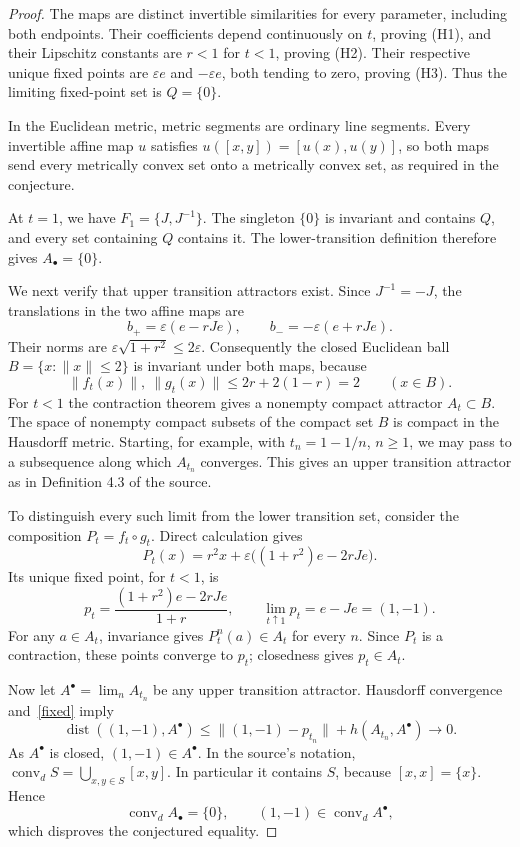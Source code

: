 \documentclass[11pt]{article}
\newcommand{\Al}{A_{\bullet}}
\newcommand{\Au}{A^{\bullet}}
\begin{document}
\begin{proof}
The maps are distinct invertible similarities for every parameter,
including both endpoints. Their coefficients depend continuously on
$t$, proving (H1), and their Lipschitz constants are $r<1$ for $t<1$,
proving (H2). Their respective unique fixed points are
$\varepsilon e$ and $-\varepsilon e$, both tending to zero, proving
(H3). Thus the limiting fixed-point set is $Q=\{0\}$.

In the Euclidean metric, metric segments are ordinary line segments.
Every invertible affine map $u$ satisfies
$u([x,y])=[u(x),u(y)]$, so both maps send every metrically convex set
onto a metrically convex set, as required in the conjecture.

At $t=1$, we have $F_1=\{J,J^{-1}\}$. The singleton $\{0\}$ is
invariant and contains $Q$, and every set containing $Q$ contains it.
The lower-transition definition therefore gives $\Al=\{0\}$.

We next verify that upper transition attractors exist. Since
$J^{-1}=-J$, the translations in the two affine maps are
\[
 b_+=\varepsilon(e-rJe),\qquad
 b_-=-\varepsilon(e+rJe).
\]
Their norms are $\varepsilon\sqrt{1+r^2}\leq2\varepsilon$.
Consequently the closed Euclidean ball $B=\{x:\|x\|\leq2\}$ is
invariant under both maps, because
\[
 \|f_t(x)\|,\ \|g_t(x)\|
 \leq2r+2(1-r)=2\qquad(x\in B).
\]
For $t<1$ the contraction theorem gives a nonempty compact attractor
$A_t\subset B$. The space of nonempty compact subsets of the compact
set $B$ is compact in the Hausdorff metric. Starting, for example,
with $t_n=1-1/n$, $n\geq1$, we may pass to a subsequence along which
$A_{t_n}$ converges. This gives an upper transition attractor as in
Definition 4.3 of the source.

To distinguish every such limit from the lower transition set,
consider the composition $P_t=f_t\circ g_t$. Direct calculation gives
\begin{equation}\label{composition}
 P_t(x)=r^2x+\varepsilon\bigl((1+r^2)e-2rJe\bigr).
\end{equation}
Its unique fixed point, for $t<1$, is
\begin{equation}\label{fixed}
 p_t=\frac{(1+r^2)e-2rJe}{1+r},
 \qquad \lim_{t\uparrow1}p_t=e-Je=(1,-1).
\end{equation}
For any $a\in A_t$, invariance gives $P_t^n(a)\in A_t$ for every
$n$. Since $P_t$ is a contraction, these points converge to $p_t$;
closedness gives $p_t\in A_t$.

Now let $\Au=\lim_n A_{t_n}$ be any upper transition attractor.
Hausdorff convergence and~\eqref{fixed} imply
\[
 \operatorname{dist}((1,-1),\Au)
 \leq\|(1,-1)-p_{t_n}\|+h(A_{t_n},\Au)\longrightarrow0.
\]
As $\Au$ is closed, $(1,-1)\in\Au$. In the source's notation,
$\operatorname{conv}_d S=\bigcup_{x,y\in S}[x,y]$. In particular
it contains $S$, because $[x,x]=\{x\}$. Hence
\[
 \operatorname{conv}_d\Al=\{0\},\qquad
 (1,-1)\in\operatorname{conv}_d\Au,
\]
which disproves the conjectured equality.
\end{proof}
\end{document}
